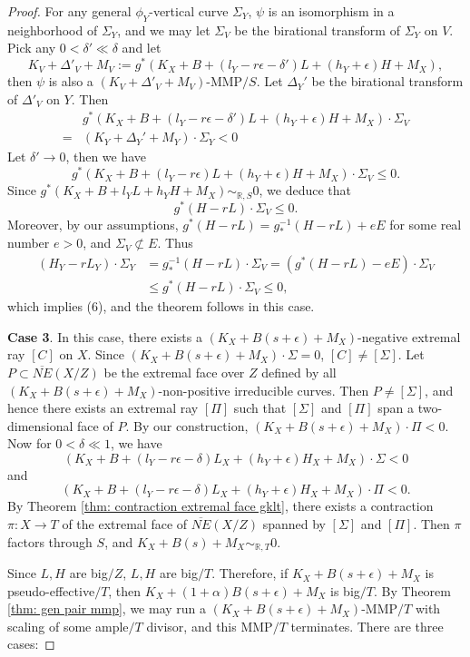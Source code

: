 \documentclass[11pt]{amsart}
\numberwithin{equation}{section}
\newcommand{\Rr}{\mathbb{R}}
\theoremstyle{definition}
\theoremstyle{remark}
\theoremstyle{definition}
\begin{document}
\begin{proof}
For any general $\phi_Y$-vertical curve $\Sigma_Y$, $\psi$ is an isomorphism in a neighborhood of $\Sigma_Y$, and we may let $\Sigma_V$ be the birational transform of $\Sigma_Y$ on $V$. Pick any $0<\delta'\ll\delta$ and let
$$K_V+\Delta'_V+M_V:=g^*(K_X+B+(l_Y-r\epsilon-\delta')L+(h_Y+\epsilon)H+M_X),$$
then $\psi$ is also a $(K_V+\Delta'_V+M_V)$-MMP$/S$. Let $\Delta_Y'$ be the birational transform of $\Delta'_V$ on $Y$. Then
\begin{align*}
&g^*(K_X+B+(l_Y-r\epsilon-\delta')L+(h_Y+\epsilon)H+M_X)\cdot\Sigma_V\\
=&(K_Y+\Delta_Y'+M_Y)\cdot\Sigma_Y<0
\end{align*}
Let $\delta'\rightarrow 0$, then we have
$$g^*(K_X+B+(l_Y-r\epsilon)L+(h_Y+\epsilon)H+M_X)\cdot\Sigma_V\leq 0.$$
Since $g^*(K_X+B+l_YL+h_YH+M_X)\sim_{\mathbb R,S}0$, we deduce that
$$g^*(H-rL)\cdot\Sigma_V\leq 0.$$
Moreover, by our assumptions, $g^*(H-rL)=g^{-1}_*(H-rL)+eE$ for some real number $e>0$, and $\Sigma_V\not\subset E$. Thus
\begin{align*}
    (H_Y-rL_Y)\cdot\Sigma_Y&=g^{-1}_*(H-rL)\cdot\Sigma_V=(g^*(H-rL)-eE)\cdot\Sigma_V\\
    &\leq g^*(H-rL)\cdot\Sigma_V\leq 0,
\end{align*}
which implies (6), and the theorem follows in this case.

\medskip

\noindent\textbf{Case 3}. In this case, there exists a $(K_X+B(s+\epsilon)+M_X)$-negative extremal ray $[C]$ on $X$. Since $(K_X+B(s+\epsilon)+M_X)\cdot\Sigma=0$, $[C]\not=[\Sigma]$. Let $P\subset\overline{NE}(X/Z)$ be the extremal face over $Z$ defined by all $(K_X+B(s+\epsilon)+M_X)$-non-positive irreducible curves. Then $P\not=[\Sigma]$, and hence there exists an extremal ray $[\Pi]$ such that $[\Sigma]$ and $[\Pi]$ span a two-dimensional face of $P$. By our construction, $(K_X+B(s+\epsilon)+M_X)\cdot\Pi<0$. Now for $0<\delta\ll 1$, we have
$$(K_X+B+(l_Y-r\epsilon-\delta)L_X+(h_Y+\epsilon)H_X+M_X)\cdot\Sigma<0$$
and
$$(K_X+B+(l_Y-r\epsilon-\delta)L_X+(h_Y+\epsilon)H_X+M_X)\cdot\Pi<0.$$
By Theorem \ref{thm: contraction extremal face gklt}, there exists a contraction $\pi: X\rightarrow T$ of the extremal face of $\overline{NE}(X/Z)$ spanned by $[\Sigma]$ and $[\Pi]$. Then $\pi$ factors through $S$, and  $K_X+B(s)+M_X\sim_{\Rr,T}0$.

Since $L,H$ are big$/Z$, $L,H$ are big$/T$. Therefore, if $K_{X}+B(s+\epsilon)+M_X$ is pseudo-effective$/T$, then $K_X+(1+\alpha)B(s+\epsilon)+M_X$ is big$/T$. By Theorem \ref{thm: gen pair mmp}, we may run a $(K_{X}+B(s+\epsilon)+M_X)$-MMP$/T$ with scaling of some ample$/T$ divisor, and this MMP$/T$ terminates. There are three cases:


\end{proof}
\end{document}
